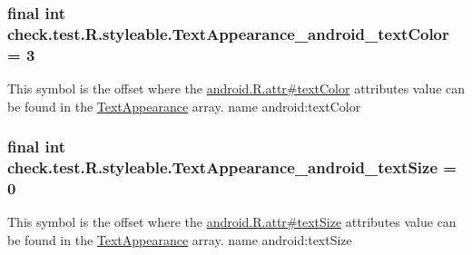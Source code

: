 \subsubsection[{Text\+Appearance\+\_\+android\+\_\+text\+Color}]{\setlength{\rightskip}{0pt plus 5cm}final int check.\+test.\+R.\+styleable.\+Text\+Appearance\+\_\+android\+\_\+text\+Color = 3\hspace{0.3cm}{\ttfamily [static]}}\label{classcheck_1_1test_1_1_r_1_1styleable_a25beaa4ed9513b44df22fb79b076e5e8}
This symbol is the offset where the \hyperlink{}{android.\+R.\+attr\#text\+Color} attribute\textquotesingle{}s value can be found in the \hyperlink{classcheck_1_1test_1_1_r_1_1styleable_a7fad54db5b363c4751d9f6f6ead61bc9}{Text\+Appearance} array.  name android\+:text\+Color \hypertarget{classcheck_1_1test_1_1_r_1_1styleable_a302a2412b9bd0616ccff3d22bd450d19}{}
\subsubsection[{Text\+Appearance\+\_\+android\+\_\+text\+Size}]{\setlength{\rightskip}{0pt plus 5cm}final int check.\+test.\+R.\+styleable.\+Text\+Appearance\+\_\+android\+\_\+text\+Size = 0\hspace{0.3cm}{\ttfamily [static]}}\label{classcheck_1_1test_1_1_r_1_1styleable_a302a2412b9bd0616ccff3d22bd450d19}
This symbol is the offset where the \hyperlink{}{android.\+R.\+attr\#text\+Size} attribute\textquotesingle{}s value can be found in the \hyperlink{classcheck_1_1test_1_1_r_1_1styleable_a7fad54db5b363c4751d9f6f6ead61bc9}{Text\+Appearance} array.  name android\+:text\+Size \hypertarget{classcheck_1_1test_1_1_r_1_1styleable_a322f409bd5e2d20b43b0f42b53151ebf}{}
